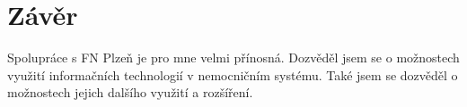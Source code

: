 \setlength{\parskip}{1em}

\chapter*{Závěr}

Spolupráce s FN Plzeň je pro mne velmi přínosná. Dozvěděl jsem se o možnostech využití informačních technologií v nemocničním systému.  Také jsem se dozvěděl o možnostech jejich dalšího využití a rozšíření.
